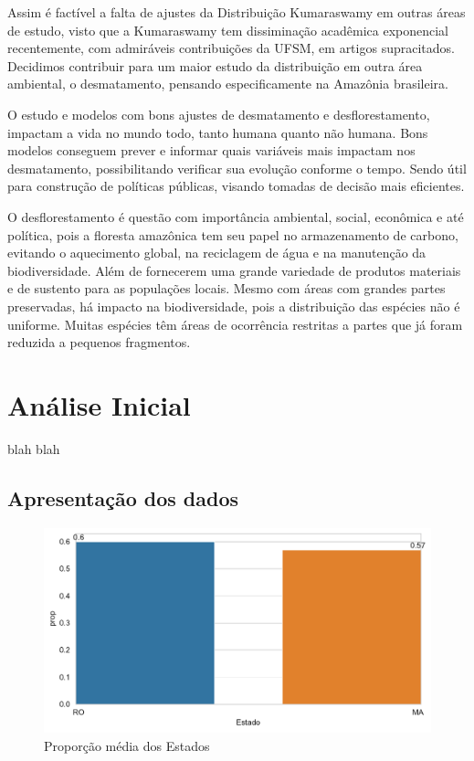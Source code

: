 \documentclass[
]{article}
\begin{document}
Assim é factível a falta de ajustes da Distribuição Kumaraswamy em
outras áreas de estudo, visto que a Kumaraswamy tem dissiminação
acadêmica exponencial recentemente, com admiráveis contribuições da
UFSM, em artigos supracitados. Decidimos contribuir para um maior estudo
da distribuição em outra área ambiental, o desmatamento, pensando
especificamente na Amazônia brasileira.

O estudo e modelos com bons ajustes de desmatamento e desflorestamento,
impactam a vida no mundo todo, tanto humana quanto não humana. Bons
modelos conseguem prever e informar quais variáveis mais impactam nos
desmatamento, possibilitando verificar sua evolução conforme o tempo.
Sendo útil para construção de políticas públicas, visando tomadas de
decisão mais eficientes.

O desflorestamento é questão com importância ambiental, social,
econômica e até política, pois a floresta amazônica tem seu papel no
armazenamento de carbono, evitando o aquecimento global, na reciclagem
de água e na manutenção da biodiversidade. Além de fornecerem uma grande
variedade de produtos materiais e de sustento para as populações locais.
Mesmo com áreas com grandes partes preservadas, há impacto na
biodiversidade, pois a distribuição das espécies não é uniforme. Muitas
espécies têm áreas de ocorrência restritas a partes que já foram
reduzida a pequenos fragmentos.

\section{\centering Análise Inicial}

blah blah

\subsection{Apresentação dos dados}

\begin{figure}

{\centering \includegraphics{report_files/figure-pdf/fig-states-output-1.pdf}

}

\caption{\label{fig-states}Proporção média dos Estados}

\end{figure}
\end{document}
